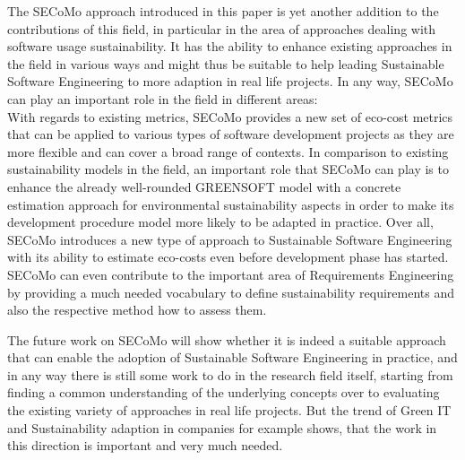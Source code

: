 \documentclass[oribibl]{llncs}
\begin{document}
The SECoMo approach introduced in this paper is yet another addition to the contributions of this field, in particular in the area of approaches dealing with software usage sustainability. %
It has the ability to enhance existing approaches in the field in various ways and might thus be suitable to help leading Sustainable Software Engineering to more adaption in real life projects. In any way, SECoMo can play an important role in the field in different areas:\\
With regards to existing metrics, SECoMo provides a new set of eco-cost metrics that can be applied to various types of software development projects as they are more flexible and can cover a broad range of contexts. In comparison to existing sustainability models in the field, an important role that SECoMo can play is to enhance the already well-rounded GREENSOFT model with a concrete estimation approach for environmental sustainability aspects in order to make its development procedure model more likely to be adapted in practice. Over all, SECoMo introduces a new type of approach to Sustainable Software Engineering with its ability to estimate eco-costs even before development phase has started. SECoMo can even contribute to the important area of Requirements Engineering by providing a much needed vocabulary to define sustainability requirements and also the respective method how to assess them. %

The future work on SECoMo will show whether it is indeed a suitable approach that can enable the adoption of Sustainable Software Engineering in practice, and in any way there is still some work to do in the research field itself, starting from finding a common understanding of the underlying concepts over to evaluating the existing variety of approaches in real life projects. But the trend of Green IT and Sustainability adaption in companies for example shows, that the work in this direction is important and very much needed.
\end{document}

